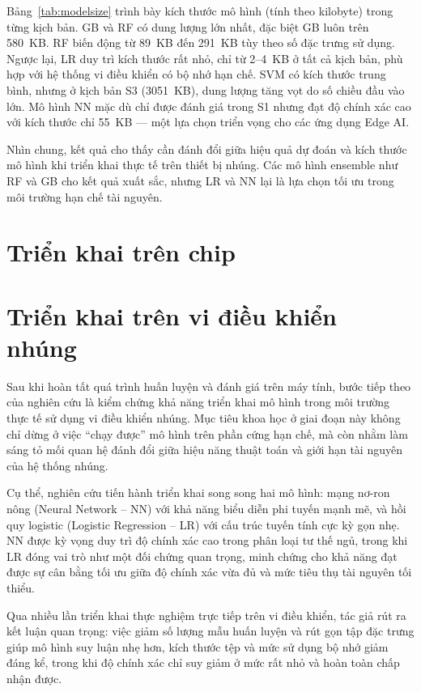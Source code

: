 Bảng~\ref{tab:modelsize} trình bày kích thước mô hình (tính theo kilobyte) trong từng kịch bản. GB và RF có dung lượng lớn nhất, đặc biệt GB luôn trên 580~KB. RF biến động từ 89~KB đến 291~KB tùy theo số đặc trưng sử dụng. Ngược lại, LR duy trì kích thước rất nhỏ, chỉ từ 2–4~KB ở tất cả kịch bản, phù hợp với hệ thống vi điều khiển có bộ nhớ hạn chế. SVM có kích thước trung bình, nhưng ở kịch bản S3 (3051~KB), dung lượng tăng vọt do số chiều đầu vào lớn. Mô hình NN mặc dù chỉ được đánh giá trong S1 nhưng đạt độ chính xác cao với kích thước chỉ 55~KB — một lựa chọn triển vọng cho các ứng dụng Edge AI.

Nhìn chung, kết quả cho thấy cần đánh đổi giữa hiệu quả dự đoán và kích thước mô hình khi triển khai thực tế trên thiết bị nhúng. Các mô hình ensemble như RF và GB cho kết quả xuất sắc, nhưng LR và NN lại là lựa chọn tối ưu trong môi trường hạn chế tài nguyên.

\section{Triển khai trên chip}

\section{Triển khai trên vi điều khiển nhúng}

Sau khi hoàn tất quá trình huấn luyện và đánh giá trên máy tính, bước tiếp theo của nghiên cứu là kiểm chứng khả năng triển khai mô hình trong môi trường thực tế sử dụng vi điều khiển nhúng. Mục tiêu khoa học ở giai đoạn này không chỉ dừng ở việc “chạy được” mô hình trên phần cứng hạn chế, mà còn nhằm làm sáng tỏ mối quan hệ đánh đổi giữa hiệu năng thuật toán và giới hạn tài nguyên của hệ thống nhúng.  

Cụ thể, nghiên cứu tiến hành triển khai song song hai mô hình: mạng nơ-ron nông (Neural Network – NN) với khả năng biểu diễn phi tuyến mạnh mẽ, và hồi quy logistic (Logistic Regression – LR) với cấu trúc tuyến tính cực kỳ gọn nhẹ. NN được kỳ vọng duy trì độ chính xác cao trong phân loại tư thế ngủ, trong khi LR đóng vai trò như một đối chứng quan trọng, minh chứng cho khả năng đạt được sự cân bằng tối ưu giữa độ chính xác vừa đủ và mức tiêu thụ tài nguyên tối thiểu.  

Qua nhiều lần triển khai thực nghiệm trực tiếp trên vi điều khiển, tác giả rút ra kết luận quan trọng: việc giảm số lượng mẫu huấn luyện và rút gọn tập đặc trưng giúp mô hình suy luận nhẹ hơn, kích thước tệp và mức sử dụng bộ nhớ giảm đáng kể, trong khi độ chính xác chỉ suy giảm ở mức rất nhỏ và hoàn toàn chấp nhận được.  

